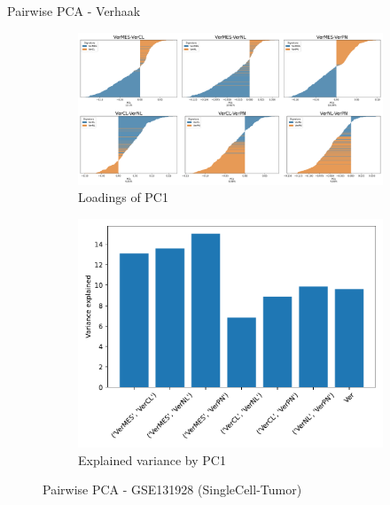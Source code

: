 \documentclass[aspectratio=169,9pt]{beamer}
\begin{document}
    \begin{frame}{Pairwise PCA - Verhaak}
        \begin{adjustwidth}{-5cm}{-5cm}
            \centering
            \begin{figure}\ContinuedFloat
                \centering
                \begin{subfigure}[c]{0.7\textwidth}
                    \centering
                    \includegraphics[width=\textwidth]{GSM3828672_loadings_barplot_pair-Ver}
                    \caption{Loadings of PC1}
                \end{subfigure}
                \begin{subfigure}[c]{0.4\textwidth}
                    \centering
                    \includegraphics[width=\textwidth]{GSM3828672_expvar_Ver}
                    \caption{Explained variance by PC1}
                \end{subfigure}
                \caption{Pairwise PCA - GSE131928 (SingleCell-Tumor)}
            \end{figure}
        \end{adjustwidth}
    \end{frame}
\end{document}
